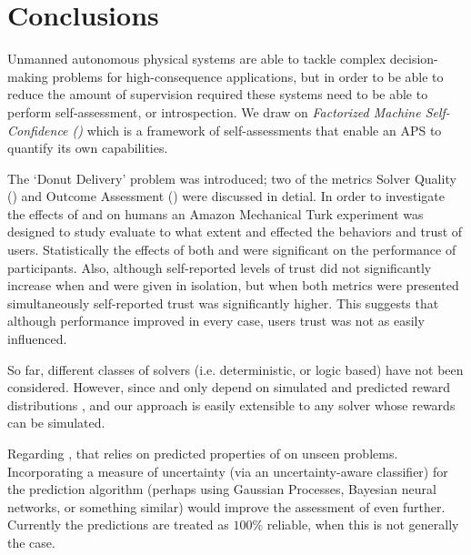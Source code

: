 \section{Conclusions} \label{sec:conclusions}
Unmanned autonomous physical systems are able to tackle complex decision-making problems for high-consequence applications, but in order to be able to reduce the amount of supervision required these systems need to be able to perform self-assessment, or introspection. We draw on \emph{Factorized Machine Self-Confidence (\famsec)} which is a framework of self-assessments that enable an APS to quantify its own capabilities.

The `Donut Delivery' problem was introduced; two of the \famsec{} metrics Solver Quality (\xQ) and Outcome Assessment (\xO) were discussed in detial. In order to investigate the effects of \xQ{} and \xO{} on humans an Amazon Mechanical Turk experiment was designed to study evaluate to what extent \xQ{} and \xO{} effected the behaviors and trust of users. Statistically the effects of both \xQ{} and \xO{} were significant on the performance of participants. Also, although self-reported levels of trust did not significantly increase when \xQ{} and \xO{} were given in isolation, but when both metrics were presented simultaneously self-reported trust was significantly higher. This suggests that although performance improved in every case, users trust was not as easily influenced.

So far, different classes of solvers (i.e. deterministic, or logic based) have not been considered. However, since \xQ{} and \xO{} only depend on simulated and predicted reward distributions \rwd{}, and \rwdtrust{} our approach is easily extensible to any solver whose rewards can be simulated. 

Regarding \xQ{}, that relies on predicted properties of \rwdtrust{} on unseen problems. Incorporating a measure of uncertainty (via an uncertainty-aware classifier) for the prediction algorithm (perhaps using Gaussian Processes, Bayesian neural networks, or something similar) would improve the assessment of \xQ{} even further. Currently the predictions are treated as $100\%$ reliable, when this is not generally the case.

